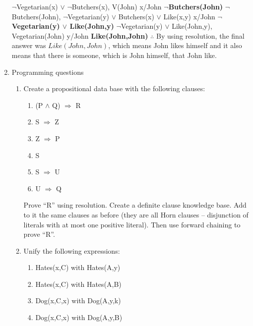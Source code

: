 \documentclass[10pt]{article}
\begin{document}
\begin{enumerate}
    \hrulefill
    
    $\neg$Vegetarian(x) $\vee$ $\neg$Butchers(x), V(John) {x/John} \newline
    \textbf{$\neg$Butchers(John)} \newline
    $\neg$Butchers(John), $\neg$Vegetarian(y) $\vee$ Butchers(x) $\vee$ Like(x,y) {x/John} \newline
    \textbf{$\neg$Vegetarian(y) $\vee$ Like(John,y)} \newline
    $\neg$Vegetarian(y) $\vee$ Like(John,y), Vegetarian(John) {y/John} \newline
    \textbf{Like(John,John)} \newline \newline
    $\therefore$ By using resolution, the final answer was $Like(John,John)$, which means John likes himself and it also means that there is someone, which is John himself, that John like.
\newpage
    \item Programming questions
    	\begin{enumerate}
    		\item Create a propositional data base with the following clauses: 
            	\begin{enumerate}
            		\item (P $\wedge$ Q) $\Rightarrow$ R
                    \item S $\Rightarrow$ Z
                    \item Z $\Rightarrow$ P
                    \item S
                    \item S $\Rightarrow$ U
                    \item U $\Rightarrow$ Q
            	\end{enumerate}
            Prove \enquote{R} using resolution. \newline
            Create a definite clause knowledge base. Add to it the same clauses as before (they are all Horn clauses -- disjunction of literals with at most one positive literal). Then use forward chaining to prove \enquote{R}.
			\item Unify the following expressions:
            	\begin{enumerate}
            		\item Hates(x,C) with Hates(A,y)
                    \item Hates(x,C) with Hates(A,B)
                    \item Dog(x,C,x) with Dog(A,y,k)
                    \item Dog(x,C,x) with Dog(A,y,B)

\end{enumerate}
\end{enumerate}
\end{enumerate}
\end{document}
